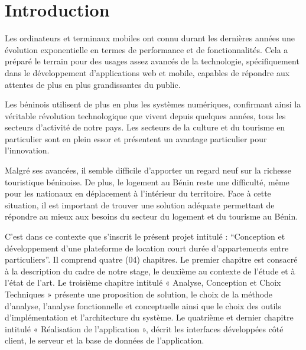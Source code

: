 \cleardoublepage
{}
\chapter*{Introduction}
Les ordinateurs et terminaux mobiles ont connu durant les dernières années une évolution exponentielle en termes de performance et de fonctionnalités. Cela a préparé le terrain pour des usages assez avancés de la technologie, spécifiquement dans le développement d’applications web et mobile, capables de répondre aux attentes de plus en plus grandissantes du public.

Les béninois utilisent de plus en plus les systèmes numériques, confirmant ainsi la véritable révolution technologique que vivent depuis quelques années, tous les secteurs d’activité de notre pays. Les secteurs de la culture et du tourisme en particulier sont en plein essor et présentent un avantage particulier pour l’innovation. 

Malgré ses avancées, il semble difficile d’apporter un regard neuf sur la richesse touristique béninoise. De plus, le logement au Bénin reste une difficulté, même pour les nationaux en déplacement à l'intérieur du territoire. Face à cette situation, il est important de trouver une solution adéquate permettant de répondre au mieux aux besoins du secteur du logement et du tourisme au Bénin.

C’est dans ce contexte que s’inscrit le présent projet intitulé : “Conception et développement d’une plateforme  de location court durée d’appartements entre particuliers”. Il comprend quatre (04) chapitres. Le premier chapitre est consacré à la description du cadre de notre stage, le deuxième au contexte de l’étude et à l’état de l’art. Le troisième chapitre intitulé « Analyse, Conception et Choix Techniques » présente une proposition de solution, le choix de la méthode d'analyse, l’analyse fonctionnelle et conceptuelle ainsi que le choix des outils d'implémentation et l’architecture du système. Le quatrième et dernier chapitre intitulé « Réalisation de l’application », décrit les interfaces développées côté client, le serveur et la base de données de l’application.
